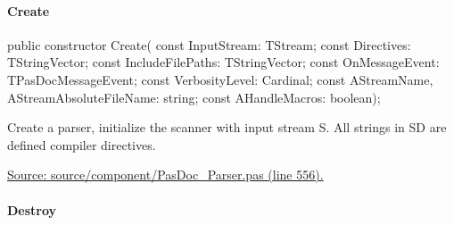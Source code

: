 \documentclass{report}
\newif\ifpdf
\begin{document}
\paragraph*{Create}\hspace*{\fill}

\label{PasDoc_Parser.TParser-Create}
\begin{list}{}{
\setlength{\itemindent}{0cm}
\setlength{\listparindent}{0cm}
\setlength{\leftmargin}{\evensidemargin}
\addtolength{\leftmargin}{\tmplength}
\settowidth{\labelsep}{X}
\addtolength{\leftmargin}{\labelsep}
\setlength{\labelwidth}{\tmplength}
}
\item[\textbf{Declaration}\hfill]
\ifpdf
\begin{flushleft}
\fi
\begin{ttfamily}
public constructor Create( const InputStream: TStream; const Directives: TStringVector; const IncludeFilePaths: TStringVector; const OnMessageEvent: TPasDocMessageEvent; const VerbosityLevel: Cardinal; const AStreamName, AStreamAbsoluteFileName: string; const AHandleMacros: boolean);\end{ttfamily}

\ifpdf
\end{flushleft}
\fi

\par
\item[\textbf{Description}]
Create a parser, initialize the scanner with input stream S. All strings in SD are defined compiler directives.\par
\href{https://github.com/pasdoc/pasdoc/blob/master/source/component/PasDoc_Parser.pas#L556}{Source: source/component/PasDoc{\_}Parser.pas (line 556).}

\end{list}
\paragraph*{Destroy}\hspace*{\fill}
\end{document}
